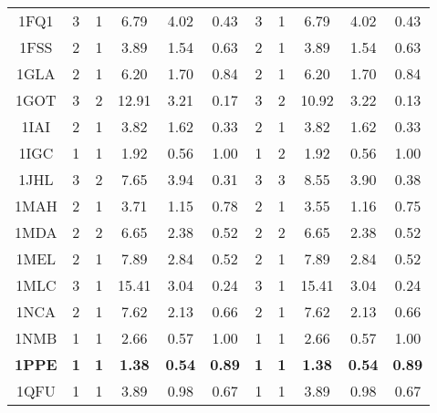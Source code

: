 \begin{longtable}{c c c c c c|c c c c c}
 {\tiny 1FQ1}&{\tiny 3}&{\tiny 1}&{\tiny 6.79}&{\tiny 4.02}&{\tiny 0.43}&{\tiny 3}&{\tiny 1}&{\tiny 6.79}&{\tiny 4.02}&{\tiny 0.43}\\ 
 {\tiny 1FSS}&{\tiny 2}&{\tiny 1}&{\tiny 3.89}&{\tiny 1.54}&{\tiny 0.63}&{\tiny 2}&{\tiny 1}&{\tiny 3.89}&{\tiny 1.54}&{\tiny 0.63}\\ 
 {\tiny 1GLA}&{\tiny 2}&{\tiny 1}&{\tiny 6.20}&{\tiny 1.70}&{\tiny 0.84}&{\tiny 2}&{\tiny 1}&{\tiny 6.20}&{\tiny 1.70}&{\tiny 0.84}\\ 
 {\tiny 1GOT}&{\tiny 3}&{\tiny 2}&{\tiny 12.91}&{\tiny 3.21}&{\tiny 0.17}&{\tiny 3}&{\tiny 2}&{\tiny 10.92}&{\tiny 3.22}&{\tiny 0.13}\\ 
 {\tiny 1IAI}&{\tiny 2}&{\tiny 1}&{\tiny 3.82}&{\tiny 1.62}&{\tiny 0.33}&{\tiny 2}&{\tiny 1}&{\tiny 3.82}&{\tiny 1.62}&{\tiny 0.33}\\ 
 {\tiny 1IGC}&{\tiny 1}&{\tiny 1}&{\tiny 1.92}&{\tiny 0.56}&{\tiny 1.00}&{\tiny 1}&{\tiny 2}&{\tiny 1.92}&{\tiny 0.56}&{\tiny 1.00}\\ 
 {\tiny 1JHL}&{\tiny 3}&{\tiny 2}&{\tiny 7.65}&{\tiny 3.94}&{\tiny 0.31}&{\tiny 3}&{\tiny 3}&{\tiny 8.55}&{\tiny 3.90}&{\tiny 0.38}\\ 
 {\tiny 1MAH}&{\tiny 2}&{\tiny 1}&{\tiny 3.71}&{\tiny 1.15}&{\tiny 0.78}&{\tiny 2}&{\tiny 1}&{\tiny 3.55}&{\tiny 1.16}&{\tiny 0.75}\\ 
 {\tiny 1MDA}&{\tiny 2}&{\tiny 2}&{\tiny 6.65}&{\tiny 2.38}&{\tiny 0.52}&{\tiny 2}&{\tiny 2}&{\tiny 6.65}&{\tiny 2.38}&{\tiny 0.52}\\ 
 {\tiny 1MEL}&{\tiny 2}&{\tiny 1}&{\tiny 7.89}&{\tiny 2.84}&{\tiny 0.52}&{\tiny 2}&{\tiny 1}&{\tiny 7.89}&{\tiny 2.84}&{\tiny 0.52}\\ 
 {\tiny 1MLC}&{\tiny 3}&{\tiny 1}&{\tiny 15.41}&{\tiny 3.04}&{\tiny 0.24}&{\tiny 3}&{\tiny 1}&{\tiny 15.41}&{\tiny 3.04}&{\tiny 0.24}\\ 
 {\tiny 1NCA}&{\tiny 2}&{\tiny 1}&{\tiny 7.62}&{\tiny 2.13}&{\tiny 0.66}&{\tiny 2}&{\tiny 1}&{\tiny 7.62}&{\tiny 2.13}&{\tiny 0.66}\\ 
 {\tiny 1NMB}&{\tiny 1}&{\tiny 1}&{\tiny 2.66}&{\tiny 0.57}&{\tiny 1.00}&{\tiny 1}&{\tiny 1}&{\tiny 2.66}&{\tiny 0.57}&{\tiny 1.00}\\ 
 \textbf{\tiny 1PPE}&\textbf{\tiny 1}&\textbf{\tiny 1}&\textbf{\tiny 1.38}&\textbf{\tiny 0.54}&\textbf{\tiny 0.89}&\textbf{\tiny 1}&\textbf{\tiny 1}&\textbf{\tiny 1.38}&\textbf{\tiny 0.54}&\textbf{\tiny 0.89}\\ 
 {\tiny 1QFU}&{\tiny 1}&{\tiny 1}&{\tiny 3.89}&{\tiny 0.98}&{\tiny 0.67}&{\tiny 1}&{\tiny 1}&{\tiny 3.89}&{\tiny 0.98}&{\tiny 0.67}\\ 

\end{longtable}
